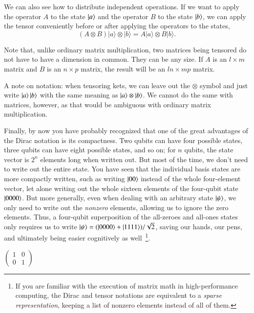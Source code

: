 We can also see how to distribute independent operations. If we want to apply the operator $A$ to the state $\left| a \right\rangle$ and the operator $B$ to the state $\left| b \right\rangle$, we can apply the tensor conveniently before or after applying the operators to the states,
\begin{equation}
(A \otimes B)|a\rangle \otimes|b\rangle=A|a\rangle \otimes B|b\rangle.
\end{equation}

Note that, unlike ordinary matrix multiplication, two matrices being tensored do not have to have a dimension in common. They can be any size. If $A$ is an $l\times m$ matrix and $B$ is an $n \times p$ matrix, the result will be an $ln \times mp$ matrix.

A note on notation: when tensoring kets, we can leave out the $\otimes$ symbol and just write $\left| a \right\rangle\left| b \right\rangle$ with the same meaning as $\left| a \right\rangle\otimes\left| b \right\rangle$. We cannot do the same with matrices, however, as that would be ambiguous with ordinary matrix multiplication.

Finally, by now you have probably recognized that one of the great advantages of the Dirac notation is its compactness. Two qubits can have four possible states, three qubits can have eight possible states, and so on; for $n$ qubits, the state vector is $2^n$ elements long when written out. But most of the time, we don't need to write out the entire state.  You have seen that the individual basis states are more compactly written, such as writing $\left| 00 \right\rangle$ instead of the whole four-element vector, let alone writing out the whole sixteen elements of the four-qubit state $\left| 0000 \right\rangle$. But more generally, even when dealing with an arbitrary state $\left| \psi \right\rangle$, we only need to write out the \emph{nonzero} elements, allowing us to ignore the zero elements.  Thus, a four-qubit superposition of the all-zeroes and all-ones states only requires us to write $\left| \psi \right\rangle = (\left| 0000 \right\rangle + \left| 1111 \right\rangle)/\sqrt{2}$, saving our hands, our pens, and ultimately being easier cognitively as well~\footnote{If you are familiar with the execution of matrix math in high-performance computing, the Dirac and tensor notations are equivalent to a \emph{sparse representation}, keeping a list of nonzero elements instead of all of them.}.

$\left(\begin{array}{ll}
1 & 0 \\
0 & 1
\end{array}\right)$


